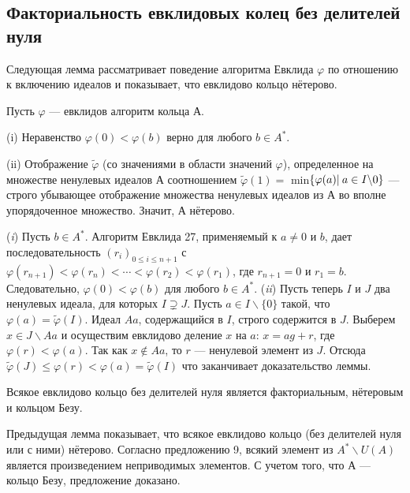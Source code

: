 \documentclass{mai_book}
\begin{document}
\subsection{Факториальность евклидовых колец без делителей нуля}
Следующая лемма рассматривает поведение алгоритма Евклида $\varphi$ по отношению к включению идеалов и показывает, что евклидово кольцо нётерово.\newline
\begin{lemma}

Пусть $\varphi$ — евклидов алгоритм кольца А.

(i) Неравенство $\varphi(0) < \varphi(b)$ верно для любого $b \in A^*.$

(ii) Отображение $\tilde{\varphi}$ (со значениями в области значений $\varphi$),  
определенное на множестве ненулевых идеалов А соотношением  $\tilde{\varphi}(1) =$ min$\{\varphi(a)\:\newline |\: a \in I \backslash 0\} $
 — строго убывающее отображение множества 
ненулевых идеалов из А во вполне упорядоченное множество. Значит, А нётерово. 
\end{lemma}
\pagebreak

\begin{myproof}
(\textit{i}) Пусть $b \in A^*$. Алгоритм Евклида 27, применяемый к $a \neq 0$ и $b$, дает последовательность $(r_i)_{0\leqslant i\leqslant n+1}$ с $\varphi(r_{n+1})< \varphi(r_n)< \cdots < \varphi(r_2) <\varphi(r_1)$, где $r_{n+1} = 0$ и $r_1 = b$. Следовательно, $\varphi(0) < \varphi(b)$ для любого $b \in A^*$.\newline
(\textit{ii}) Пусть теперь $I$ и $J$ два ненулевых идеала, для которых $I \supsetneq J$. Пусть $a \in I \backslash  \{0\}$ такой, что $\varphi(a) = \tilde{\varphi}(I)$. Идеал $Aa$, содержащийся в $I$, строго содержится в $J$. Выберем $x \in J \backslash Aa$ и осуществим евклидово деление $x$ на $a$: $x = ag + r$, где $\varphi(r) < \varphi(a)$. Так как $x \notin Aa$, то $r$ — ненулевой элемент из $J$. Отсюда $\tilde{\varphi}(J)\leq \varphi(r) < \varphi(a) =\tilde{\varphi}(I)$ что заканчивает доказательство леммы.
\end{myproof}

\begin{predl}
\hspace*{0.5cm}Всякое евклидово кольцо без делителей нуля является факториальным, нётеровым и кольцом Безу.
\end{predl}


\begin{myproof}
Предыдущая лемма показывает, что всякое евклидово кольцо (без делителей нуля или с ними) нётерово. Согласно предложению 9, всякий элемент из $A^* \backslash U(A)$ является произведением неприводимых элементов. С учетом того, что $А$ — кольцо Безу, предложение доказано.
\end{myproof}
\end{document}
